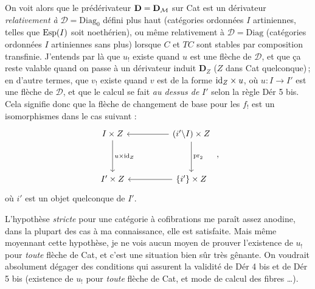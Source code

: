 On voit alors que le prédérivateur $\mathbf{D} = \mathbf{D}_{\mathcal{M}}$ sur Cat est un dérivateur \textit{relativement à} $\mathcal{D} = \mathrm{Diag}_0$ défini plus haut (catégories ordonnées $I$ artiniennes, telles que $\operatorname{Esp}(I)$ soit noethérien), ou même relativement à $\mathcal{D} = \mathrm{Diag}$ (catégories ordonnées $I$ artiniennes sans plus) lorsque $C$ et $TC$ sont stables par composition transfinie. J'entends par là que $u_!$ existe quand $u$ est une flèche de $\mathcal{D}$,
et que ça reste valable quand on passe à un dérivateur induit $\mathbf{D}_Z$ ($Z$ dans Cat quelconque)\,; en d'autre termes, que $v_!$ existe quand $v$ est de la forme $\mathrm{id}_Z\times u$, où $u : I\longrightarrow I'$ est une %
flèche de $\mathcal{D}$, et que le calcul se fait \textit{au dessus de} $I'$ selon la règle Dér 5 bis. Cela signifie donc que la flèche de changement de base pour les $f_!$ est un isomorphismes dans le cas %
suivant :
\[
\begin{tikzcd}[row sep=huge, column sep=huge]
I\times Z \arrow[d, "u\times\id_Z"] & (i'\backslash I)\times Z \arrow[l] \arrow[d, "\pr_2"] \\
I'\times Z & \{i'\}\times Z \arrow[l]
\end{tikzcd}
\ ,
\]
où $i'$ est un objet quelconque de $I'$.

L'hypothèse \textit{stricte} pour une catégorie à cofibrations me paraît assez anodine, dans la plupart des cas à ma connaissance, elle est satisfaite. Mais même moyennant cette hypothèse, je ne vois aucun moyen de prouver l'existence de $u_!$ pour \textit{toute} flèche de Cat, et c'est une situation bien sûr très gênante. On voudrait absolument dégager des conditions qui assurent la validité de Dér 4 bis et de Dér 5 bis (existence de $u_!$ pour
\textit{toute} flèche de Cat, et mode de calcul des fibres \dots).

